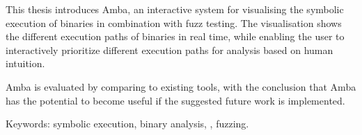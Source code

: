 This thesis introduces Amba, an interactive system for visualising
the symbolic execution of binaries in combination with fuzz testing. The
visualisation shows the different execution paths of binaries in real time,
while enabling the user to interactively prioritize different execution
paths for analysis based on human intuition.

Amba is evaluated by comparing to existing tools, with the conclusion
that Amba has the potential to become useful if the suggested future work is
implemented.

Keywords: symbolic execution, binary analysis, \stoe{}, fuzzing.
